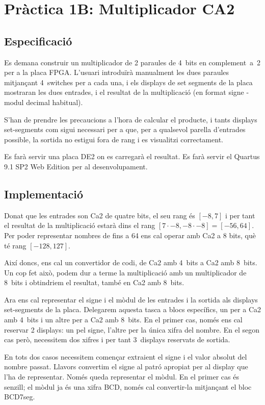\chapter{Pràctica 1B: Multiplicador CA2}

\section{Especificació}

Es demana construir un multiplicador de 2 paraules de 4~bits en complement~a~2 per
a la placa FPGA. L'usuari introduïrà manualment les dues paraules mitjançant
4~switches per a cada una, i els displays de set segments de la placa mostraran
les dues entrades, i el resultat de la multiplicació (en format signe - modul
decimal habitual).

S'han de prendre les precaucions a l'hora de calcular el producte, i tants displays
set-segments com sigui necessari per a que, per a qualsevol parella d'entrades
possible, la sortida no estigui fora de rang i es visualitzi correctament.

Es farà servir una placa DE2 on es carregarà el resultat. Es farà servir el
Quartus 9.1 SP2 Web Edition per al desenvolupament.

\section{Implementació}

Donat que les entrades son Ca2 de quatre bits, el seu rang és $\left[-8,7\right]$
i per tant el resultat de la multiplicació estarà dins el rang $\left[7 \cdot -8, -8 \cdot -8\right] = \left[-56, 64\right]$. Per poder representar nombres de fins a 64 ens cal operar amb Ca2 a 8 bits, què té rang $\left[-128, 127\right]$.

Així doncs, ens cal un convertidor de codi, de Ca2 amb 4~bits a Ca2 amb 8~bits.
Un cop fet això, podem dur a terme la multiplicació amb un multiplicador de 8~bits
i obtindriem el resultat, també en Ca2 amb 8~bits.

Ara ens cal representar el signe i el mòdul de les entrades i la sortida als 
displays set-segments de la placa. Delegarem aquesta
tasca a blocs específics, un per a Ca2 amb 4~bits i un altre per a Ca2 amb 8~bits.
En el primer cas, només ens cal reservar 2 displays: un pel signe, l'altre per la
única xifra del nombre. En el segon cas però, necessitem dos xifres i per tant
3~displays reservats de sortida.

En tots dos casos necessitem començar extraient el signe i el valor absolut del nombre passat. Llavors convertim el signe al patró apropiat per al display que
l'ha de representar. Només queda representar el mòdul. En el primer cas és senzill;
el mòdul ja és una xifra BCD, només cal convertir-la mitjançant el bloc
\textsf{BCD7seg}.

